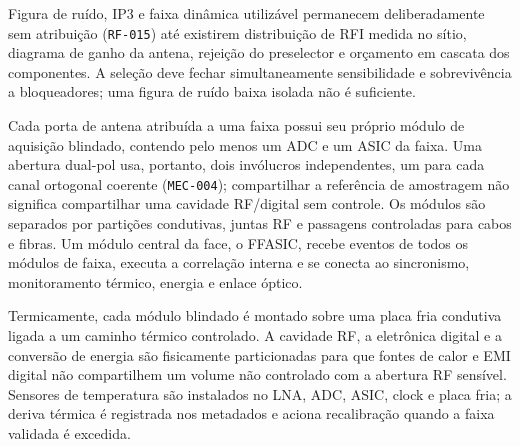 Figura de ruído, IP3 e faixa dinâmica utilizável permanecem deliberadamente sem atribuição (\texttt{RF-015}) até existirem distribuição de RFI medida no sítio, diagrama de ganho da antena, rejeição do preselector e orçamento em cascata dos componentes. A seleção deve fechar simultaneamente sensibilidade e sobrevivência a bloqueadores; uma figura de ruído baixa isolada não é suficiente.

Cada porta de antena atribuída a uma faixa possui seu próprio módulo de aquisição blindado, contendo pelo menos um ADC e um ASIC da faixa. Uma abertura dual-pol usa, portanto, dois invólucros independentes, um para cada canal ortogonal coerente (\texttt{MEC-004}); compartilhar a referência de amostragem não significa compartilhar uma cavidade RF/digital sem controle. Os módulos são separados por partições condutivas, juntas RF e passagens controladas para cabos e fibras. Um módulo central da face, o FFASIC, recebe eventos de todos os módulos de faixa, executa a correlação interna e se conecta ao sincronismo, monitoramento térmico, energia e enlace óptico.

Termicamente, cada módulo blindado é montado sobre uma placa fria condutiva ligada a um caminho térmico controlado. A cavidade RF, a eletrônica digital e a conversão de energia são fisicamente particionadas para que fontes de calor e EMI digital não compartilhem um volume não controlado com a abertura RF sensível. Sensores de temperatura são instalados no LNA, ADC, ASIC, clock e placa fria; a deriva térmica é registrada nos metadados e aciona recalibração quando a faixa validada é excedida.
